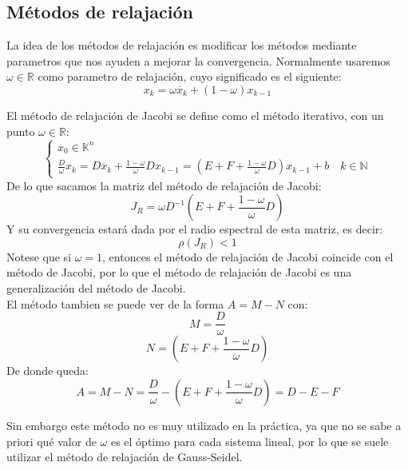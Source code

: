 \subsection{Métodos de relajación}

La idea de los métodos de relajación es modificar los métodos mediante parametros que nos ayuden a mejorar la convergencia. Normalmente usaremos $\omega \in \mathbb{R}$ como parametro de relajación, cuyo significado es el siguiente:
\[
    x_k = \omega \overline{x}_k + (1-\omega) x_{k-1}
\]

\begin{teorema}
    El método de relajación de Jacobi se define como el método iterativo, con un punto $\omega \in \mathbb{R}$:
    \[
    \begin{cases}
        x_0 \in \mathbb{K}^n \\
        \frac{D}{\omega} x_k = D \overline{x}_k + \frac{1-\omega}{\omega} D x_{k-1} =
        \left( E + F + \frac{1-\omega}{\omega} D \right) x_{k-1} + b \quad k \in \mathbb{N}
    \end{cases}
    \]
    De lo que sacamos la matriz del método de relajación de Jacobi:
    \[
        J_R = \omega D^{-1} \left( E + F + \frac{1-\omega}{\omega} D \right) 
    \]
    Y su convergencia estará dada por el radio espectral de esta matriz, es decir:
    \[
        \rho(J_R) < 1
    \]
    Notese que si $\omega = 1$, entonces el método de relajación de Jacobi coincide con el método de Jacobi, por lo que el método de relajación de Jacobi es una generalización del método de Jacobi.\\
    El método tambien se puede ver de la forma $A = M - N$ con:
    \[
        M = \frac{D}{\omega}
    \]
    \[
        N = \left( E + F + \frac{1-\omega}{\omega} D \right)
    \]
    De donde queda:
    \[
        A = M - N =
        \frac{D}{\omega} - \left( E + F + \frac{1-\omega}{\omega} D \right) =
        D - E - F
    \]
\end{teorema}

Sin embargo este método no es muy utilizado en la práctica, ya que no se sabe a priori qué valor de $\omega$ es el óptimo para cada sistema lineal, por lo que se suele utilizar el método de relajación de Gauss-Seidel.

